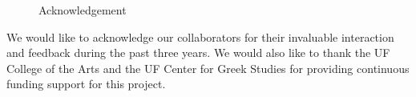 \documentclass[amsthm,ebook]{saparticle}
\begin{document}
\bigskip



\begin{figure}
\centering
\begin{minipage}{10.901cm}
Acknowledgement


\bigskip
\end{minipage}
\end{figure}
We would like to acknowledge our collaborators for their invaluable interaction and feedback during the past three
years. We would also like to thank the UF College of the Arts and the UF Center for Greek Studies for providing
continuous funding support for this project. 



\end{document}
